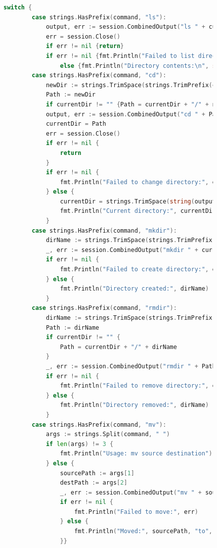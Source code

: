 \documentclass[a4paper, 14pt]{extarticle}
\begin{document}
\newpage

\begin{figure}[!htb]
\begin{lstlisting}[language={Go},caption={client.go - продолжение},label={lst:code2}]
switch {
		case strings.HasPrefix(command, "ls"):
			output, err := session.CombinedOutput("ls " + currentDir)
			err = session.Close()
			if err != nil {return}
			if err != nil {fmt.Println("Failed to list directory:", err)}
                else {fmt.Println("Directory contents:\n", string(output))}
		case strings.HasPrefix(command, "cd"):
			newDir := strings.TrimSpace(strings.TrimPrefix(command, "cd"))
			Path := newDir
			if currentDir != "" {Path = currentDir + "/" + newDir}
			output, err := session.CombinedOutput("cd " + Path + " && pwd")
			currentDir = Path
			err = session.Close()
			if err != nil {
				return
			}
			if err != nil {
				fmt.Println("Failed to change directory:", err)
			} else {
				currentDir = strings.TrimSpace(string(output))
				fmt.Println("Current directory:", currentDir)
			}
		case strings.HasPrefix(command, "mkdir"):
			dirName := strings.TrimSpace(strings.TrimPrefix(command, "mkdir"))
			_, err := session.CombinedOutput("mkdir " + currentDir + "/" + dirName)
			if err != nil {
				fmt.Println("Failed to create directory:", err)
			} else {
				fmt.Println("Directory created:", dirName)
			}
		case strings.HasPrefix(command, "rmdir"):
			dirName := strings.TrimSpace(strings.TrimPrefix(command, "rmdir"))
			Path := dirName
			if currentDir != "" {
				Path = currentDir + "/" + dirName
			}
			_, err := session.CombinedOutput("rmdir " + Path)
			if err != nil {
				fmt.Println("Failed to remove directory:", err)
			} else {
				fmt.Println("Directory removed:", dirName)
			}
		case strings.HasPrefix(command, "mv"):
			args := strings.Split(command, " ")
			if len(args) != 3 {
				fmt.Println("Usage: mv source destination")
			} else {
				sourcePath := args[1]
				destPath := args[2]
				_, err := session.CombinedOutput("mv " + sourcePath + " " + destPath)
				if err != nil {
					fmt.Println("Failed to move:", err)
				} else {
					fmt.Println("Moved:", sourcePath, "to", destPath)
				}}

\end{lstlisting}
\end{figure}
\end{document}
